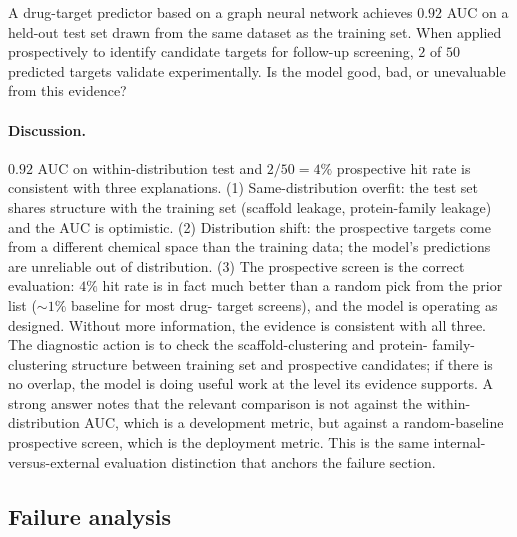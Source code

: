 \begin{exercise}
A drug-target predictor based on a graph neural network achieves
$0.92$ AUC on a held-out test set drawn from the same dataset as the
training set. When applied prospectively to identify candidate
targets for follow-up screening, $2$ of $50$ predicted targets
validate experimentally. Is the model good, bad, or unevaluable from
this evidence?

\paragraph{Discussion.}
$0.92$ AUC on within-distribution test and $2/50 = 4\%$ prospective
hit rate is consistent with three explanations. (1) Same-distribution
overfit: the test set shares structure with the training set
(scaffold leakage, protein-family leakage) and the AUC is optimistic.
(2) Distribution shift: the prospective targets come from a different
chemical space than the training data; the model's predictions are
unreliable out of distribution. (3) The prospective screen is the
correct evaluation: $4\%$ hit rate is in fact much better than a
random pick from the prior list ($\sim 1\%$ baseline for most drug-
target screens), and the model is operating as designed. Without more
information, the evidence is consistent with all three. The
diagnostic action is to check the scaffold-clustering and protein-
family-clustering structure between training set and prospective
candidates; if there is no overlap, the model is doing useful work at
the level its evidence supports. A strong answer notes that the
relevant comparison is not against the within-distribution AUC, which
is a development metric, but against a random-baseline prospective
screen, which is the deployment metric. This is the same
internal-versus-external evaluation distinction that anchors the
failure section.
\end{exercise}

\subsection*{Failure analysis}

